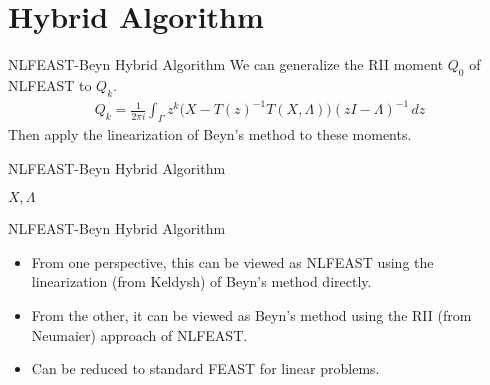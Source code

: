 \documentclass[mathserif]{beamer}
\begin{document}
\section{Hybrid Algorithm}

\begin{frame}{NLFEAST-Beyn Hybrid Algorithm}
	We can generalize the RII moment \( Q_0 \) of NLFEAST to \( Q_k \).	
	\begin{align}
		Q_k = \frac{1}{2 \pi i } \int_\Gamma z^k \Big(X - {T(z)}^{-1} T(X, \Lambda) \Big) {(zI - \Lambda)}^{-1} \, dz
	\end{align}
	Then apply the linearization of Beyn's method to these moments.

\end{frame}

\begin{frame}{NLFEAST-Beyn Hybrid Algorithm}

      \begin{algorithmic}
	\ENDWHILE
	\RETURN \( X, \Lambda \)
      \end{algorithmic}
      
\end{frame}

\begin{frame}{NLFEAST-Beyn Hybrid Algorithm}
	\begin{itemize}
		\item From one perspective, this can be viewed as NLFEAST using the linearization (from Keldysh) of Beyn's method directly.
			\vspace{2em}
		\item From the other, it can be viewed as Beyn's method using the RII (from Neumaier) approach of NLFEAST.\@
			\vspace{2em}
		\item Can be reduced to standard FEAST for linear problems.
	\end{itemize}
\end{frame}
\end{document}
